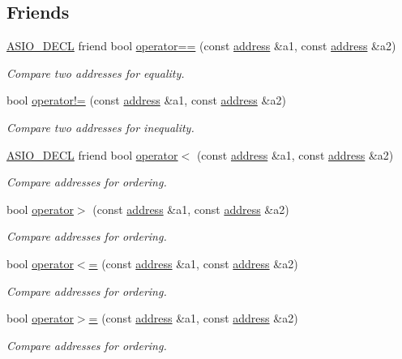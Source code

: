 \subsection*{Friends}
\begin{DoxyCompactItemize}
\item 
\hyperlink{config_8hpp_ab54d01ea04afeb9a8b39cfac467656b7}{A\+S\+I\+O\+\_\+\+D\+E\+C\+L} friend bool \hyperlink{classasio_1_1ip_1_1address_ad844037eb67887c174b1d1c3a0c8d3ad}{operator==} (const \hyperlink{classasio_1_1ip_1_1address}{address} \&a1, const \hyperlink{classasio_1_1ip_1_1address}{address} \&a2)
\begin{DoxyCompactList}\small\item\em Compare two addresses for equality. \end{DoxyCompactList}\item 
bool \hyperlink{classasio_1_1ip_1_1address_aef26f6df34e8c141a11dd6566c64080a}{operator!=} (const \hyperlink{classasio_1_1ip_1_1address}{address} \&a1, const \hyperlink{classasio_1_1ip_1_1address}{address} \&a2)
\begin{DoxyCompactList}\small\item\em Compare two addresses for inequality. \end{DoxyCompactList}\item 
\hyperlink{config_8hpp_ab54d01ea04afeb9a8b39cfac467656b7}{A\+S\+I\+O\+\_\+\+D\+E\+C\+L} friend bool \hyperlink{classasio_1_1ip_1_1address_a79be7b8746253b5471962582da55bb6d}{operator$<$} (const \hyperlink{classasio_1_1ip_1_1address}{address} \&a1, const \hyperlink{classasio_1_1ip_1_1address}{address} \&a2)
\begin{DoxyCompactList}\small\item\em Compare addresses for ordering. \end{DoxyCompactList}\item 
bool \hyperlink{classasio_1_1ip_1_1address_a7c77b776b22371672d9fbae3e2e0db73}{operator$>$} (const \hyperlink{classasio_1_1ip_1_1address}{address} \&a1, const \hyperlink{classasio_1_1ip_1_1address}{address} \&a2)
\begin{DoxyCompactList}\small\item\em Compare addresses for ordering. \end{DoxyCompactList}\item 
bool \hyperlink{classasio_1_1ip_1_1address_a8c945fb4b469051282e2fc29c68da4f9}{operator$<$=} (const \hyperlink{classasio_1_1ip_1_1address}{address} \&a1, const \hyperlink{classasio_1_1ip_1_1address}{address} \&a2)
\begin{DoxyCompactList}\small\item\em Compare addresses for ordering. \end{DoxyCompactList}\item 
bool \hyperlink{classasio_1_1ip_1_1address_a892a37897b59ba44a45f4b6669b76f27}{operator$>$=} (const \hyperlink{classasio_1_1ip_1_1address}{address} \&a1, const \hyperlink{classasio_1_1ip_1_1address}{address} \&a2)
\begin{DoxyCompactList}\small\item\em Compare addresses for ordering. \end{DoxyCompactList}\end{DoxyCompactItemize}
